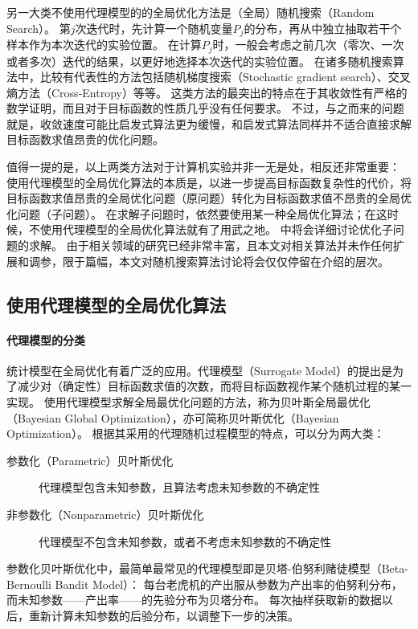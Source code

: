 \documentclass[index]{subfiles}
\begin{document}
另一大类不使用代理模型的的全局优化方法是（全局）随机搜索（Random Search）。
第$j$次迭代时，先计算一个随机变量$P_j$的分布，再从中独立抽取若干个样本作为本次迭代的实验位置。
在计算$P_j$时，一般会考虑之前几次（零次、一次或者多次）迭代的结果，以更好地选择本次迭代的实验位置。
在诸多随机搜索算法中，比较有代表性的方法包括随机梯度搜索（Stochastic gradient search）、交叉熵方法（Cross-Entropy）等等\cite{zabinsky2009}。
这类方法的最突出的特点在于其收敛性有严格的数学证明，而且对于目标函数的性质几乎没有任何要求\cite{zhigljavsky2007}。
不过，与之而来的问题就是，收敛速度可能比启发式算法更为缓慢，和启发式算法同样并不适合直接求解目标函数求值昂贵的优化问题。

值得一提的是，以上两类方法对于计算机实验并非一无是处，相反还非常重要：
使用代理模型的全局优化算法的本质是，以进一步提高目标函数复杂性的代价，将目标函数求值昂贵的全局优化问题（原问题）转化为目标函数求值不昂贵的全局优化问题（子问题）。
在求解子问题时，依然要使用某一种全局优化算法；在这时候，不使用代理模型的全局优化算法就有了用武之地。
中将会详细讨论优化子问题的求解。
由于相关领域的研究已经非常丰富，且本文对相关算法并未作任何扩展和调参，限于篇幅，本文对随机搜索算法讨论将会仅仅停留在介绍的层次。

\subsection{使用代理模型的全局优化算法}\label{ssec:go-mdl}
\paragraph{代理模型的分类}
统计模型在全局优化有着广泛的应用。代理模型（Surrogate Model）的提出是为了减少对（确定性）目标函数求值的次数，而将目标函数视作某个随机过程的某一实现。
使用代理模型求解全局最优化问题的方法，称为贝叶斯全局最优化（Bayesian Global Optimization），亦可简称贝叶斯优化（Bayesian Optimization）。
根据其采用的代理随机过程模型的特点，可以分为两大类：
\begin{description}
  \item[参数化（Parametric）贝叶斯优化] 代理模型包含未知参数，且算法考虑未知参数的不确定性
  \item[非参数化（Nonparametric）贝叶斯优化] 代理模型不包含未知参数，或者不考虑未知参数的不确定性
\end{description}

参数化贝叶斯优化中，最简单最常见的代理模型即是贝塔-伯努利赌徒模型（Beta-Bernoulli Bandit Model）：
每台老虎机的产出服从参数为产出率的伯努利分布，而未知参数——产出率——的先验分布为贝塔分布。
每次抽样获取新的数据以后，重新计算未知参数的后验分布，以调整下一步的决策。\cite{shahriari2016}
\end{document}
